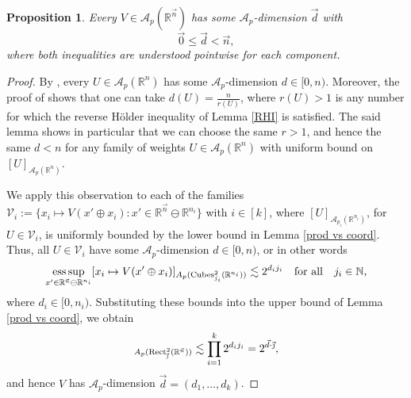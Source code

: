 \documentclass[11pt, reqno]{amsart}
\newtheorem{proposition}[theorem]{Proposition}
\theoremstyle{definition}
\theoremstyle{remark}
\numberwithin{equation}{section}
\newcommand{\A}{\mathscr A}
\newcommand{\N}{\mathbb N}
\newcommand{\R}{\mathbb R}
\newcommand{\Vs}{\mathscr V}
\newcommand{\vnull}{\vec 0}
\newcommand{\vd}{\vec d}
\newcommand{\vj}{\vec{\textit{\j}}}
\newcommand{\vn}{\vec n}
\newcommand{\esssup}{\operatornamewithlimits{ess\,sup}}
\newcommand{\Cubes}{\mathrm{Cubes}}
\newcommand{\Rect}{\mathrm{Rect}}
\begin{document}
\begin{proposition}\label{d<n}
Every $V\in\A_{p}(\R^{\vn})$ has some $\A_{p}$-dimension $\vd$ with
\begin{equation*}
\vnull\leq \vd<\vn,
\end{equation*}
where both inequalities are understood pointwise for each component.
\end{proposition}

\begin{proof}
By \cite[Proposition 2.27]{BHYY:1a}, every $U\in\A_p(\R^n)$ has some $\A_p$-dimension $d\in[0,n)$. Moreover, the proof of \cite[Proposition 2.27]{BHYY:1a} shows that one can take $d(U)=\frac{n}{r(U)}$, where $r(U)>1$ is any number for which the reverse H\"older inequality of Lemma \ref{RHI} is satisfied. The said lemma shows in particular that we can choose the same $r>1$, and hence the same $d<n$ for any family of weights $U\in\A_p(\R^n)$ with uniform bound on $[U]_{\A_p(\R^n)}$.

We apply this observation to each of the families $\Vs_i:=\{x_i\mapsto V(x'\oplus x_i):x'\in\R^{\vn}\ominus\R^{n_i}\}$ with $i\in[k]$,
where $[U]_{\A_{p_i}(\R^{n_i})}$, for $U\in\Vs_i$, is uniformly bounded by the lower bound in Lemma \ref{prod vs coord}. Thus, all $U\in\Vs_i$ have some $\A_{p}$-dimension $d\in[0,n)$, or in other words
\begin{equation*}
\esssup_{x'\in\R^{\vn}\ominus\R^{n_i}} [x_i\mapsto V(x'\oplus x_i)]_{A_{p}(\Cubes^2_{j_i}(\R^{n_i}))}\lesssim 2^{d_i j_i}\quad
\text{for all}\quad j_i\in\N,
\end{equation*}
where $d_i\in[0,n_i)$.
Substituting these bounds into the upper bound of Lemma \ref{prod vs coord}, we obtain
\begin{equation*}
[V]_{A_{p}(\Rect^2_{\vj}(\R^{\vn}))}\lesssim\prod_{i=1}^k 2^{d_i j_i}=2^{\vd\cdot\vj},
\end{equation*}
and hence $V$ has $\A_{p}$-dimension $\vd=(d_1,\ldots,d_k)$.
\end{proof}
\end{document}
